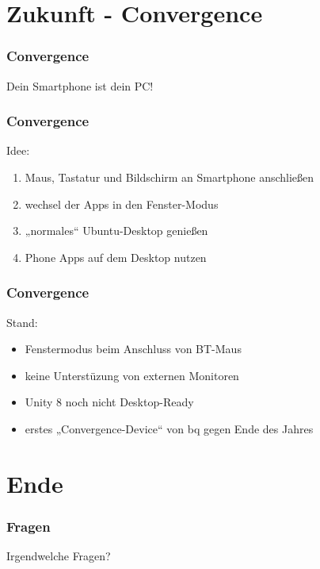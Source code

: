 \documentclass{beamer}
\begin{document}
\section{Zukunft - Convergence}

\frame{\sectionpage}

\begin{frame}
  \frametitle{Convergence}
  \large{Dein Smartphone ist dein PC!}
\end{frame}

\begin{frame}
  \frametitle{Convergence}
  Idee:
  \begin{enumerate}
    \item Maus, Tastatur und Bildschirm an Smartphone anschließen
    \item wechsel der Apps in den Fenster-Modus
    \item „normales“ Ubuntu-Desktop genießen
    \item Phone Apps auf dem Desktop nutzen
  \end{enumerate}
\end{frame}

\begin{frame}
  \frametitle{Convergence}
  Stand:
  \begin{itemize}
    \item Fenstermodus beim Anschluss von BT-Maus
    \item keine Unterstüzung von externen Monitoren
    \item Unity 8 noch nicht Desktop-Ready
    \item erstes „Convergence-Device“ von bq gegen Ende des Jahres
  \end{itemize}
\end{frame}

\section{Ende}

\begin{frame}
  \frametitle{Fragen}
  \large{Irgendwelche Fragen?}
\end{frame}
\end{document}
